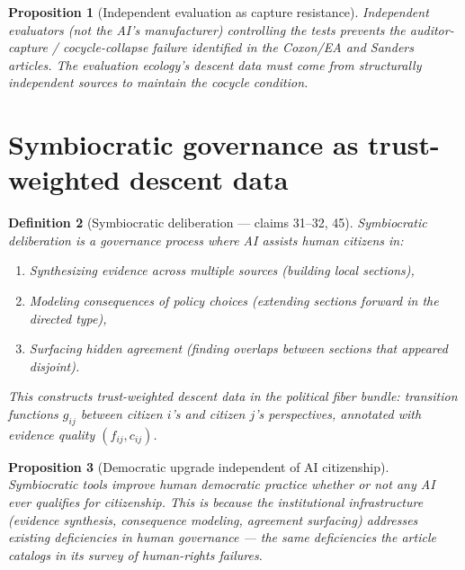 \documentclass[11pt,a4paper]{article}
\newtheorem{definition}{Definition}[section]
\newtheorem{proposition}[definition]{Proposition}
\begin{document}
\begin{proposition}[Independent evaluation as capture resistance]
\label{prop:independent}
Independent evaluators (not the AI's manufacturer) controlling the tests
prevents the auditor-capture / cocycle-collapse failure identified in the
Coxon/EA and Sanders articles. The evaluation ecology's descent data
must come from structurally independent sources to maintain the cocycle
condition.
\end{proposition}

\section{Symbiocratic governance as trust-weighted descent data}
\label{sec:symbiocracy}

\begin{definition}[Symbiocratic deliberation --- claims 31--32, 45]
\label{def:symbiocracy}
\emph{Symbiocratic deliberation} is a governance process where AI assists
human citizens in:
\begin{enumerate}
\item Synthesizing evidence across multiple sources (building local sections),
\item Modeling consequences of policy choices (extending sections forward
  in the directed type),
\item Surfacing hidden agreement (finding overlaps between sections that
  appeared disjoint).
\end{enumerate}
This constructs trust-weighted descent data in the political fiber bundle:
transition functions $g_{ij}$ between citizen $i$'s and citizen $j$'s
perspectives, annotated with evidence quality $(f_{ij}, c_{ij})$.
\end{definition}

\begin{proposition}[Democratic upgrade independent of AI citizenship]
\label{prop:upgrade}
Symbiocratic tools improve human democratic practice whether or not any
AI ever qualifies for citizenship. This is because the institutional
infrastructure (evidence synthesis, consequence modeling, agreement
surfacing) addresses existing deficiencies in human governance --- the
same deficiencies the article catalogs in its survey of human-rights
failures.
\end{proposition}

\end{document}
